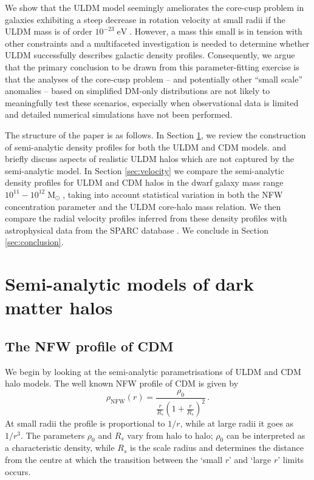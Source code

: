 \documentclass{pasa}%
\begin{document}
We show that  the ULDM model seemingly ameliorates the core-cusp problem in galaxies  exhibiting a steep decrease in rotation velocity at small radii if the ULDM mass is of order $10^{-23}\operatorname{eV}$. However, a mass this small is in tension with other   constraints and a multifaceted investigation is needed to determine whether ULDM successfully describes galactic density profiles. Consequently, we argue that the primary conclusion to be drawn from this parameter-fitting exercise is that the analyses of the core-cusp problem -- and potentially other ``small scale'' anomalies -- based on simplified DM-only distributions are not likely to meaningfully test these scenarios, especially when  observational data is limited and detailed numerical simulations have not been performed. 

The structure of the paper is as follows. In Section \ref{sec:models}, we review the construction of semi-analytic density profiles for both the ULDM and CDM models. and briefly discuss aspects of realistic ULDM halos which are not captured by the semi-analytic model. In Section \ref{sec:velocity} we compare the semi-analytic density profiles for ULDM and CDM halos in the dwarf galaxy mass range $10^{11} - 10^{12}\operatorname{M}_{\odot}$, taking into account statistical variation in both the NFW concentration parameter and the ULDM core-halo mass relation. We then compare the radial velocity profiles inferred from these density profiles with astrophysical data from the SPARC database \cite{Lelli:2016zqa}. We conclude in Section \ref{sec:conclusion}.

 
\section{Semi-analytic models of dark matter halos}\label{sec:models}


\subsection{The NFW profile of CDM}\label{sec:NFW}

We begin by looking at the semi-analytic parametrisations of ULDM and CDM halo models. The  well known  NFW   profile of CDM \cite{Navarro:1995iw, Maccio:2008pcd}  is given by
%
\begin{equation}\label{eq:nfw}
    \rho_\mathrm{NFW}(r)=\frac{\rho_0}{\frac{r}{R_s}\left(1+\frac{r}{R_s}\right)^2} \, .
\end{equation}
%
At small radii the profile is proportional to $1/r$, while at large radii it goes as $1/r^3$. The parameters $\rho_0$ and $R_s$ vary from halo to halo; $\rho_0$ can be interpreted as a characteristic density, while $R_s$ is the scale radius and determines the distance from the centre at which the transition between the `small $r$' and `large $r$' limits occurs. 
\end{document}
